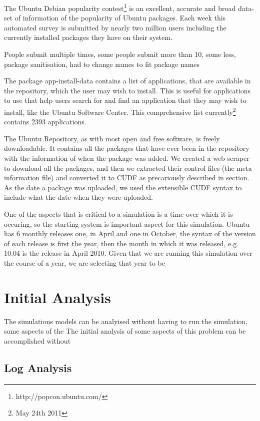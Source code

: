 The Ubuntu Debian popularity contest\footnote{http://popcon.ubuntu.com/} is an excellent, accurate and broad data-set of information of the popularity of Ubuntu packages.
Each week this automated survey is submitted by nearly two million users including the currently installed packages they have on their system.

People submit multiple times, some people submit more than 10, some less, package sanitisation, had to change names to fit package names

The package app-install-data contains a list of applications, that are available in the repository, which the user may wish to install.
This is useful for applications to use that help users search for and find an application that they may wish to install, like the Ubuntu Software Center.
This comprehensive list currently\footnote{May 24th 2011} contains 2393 applications.

The Ubuntu Repository, as with most open and free software, is freely downloadable.
It contains all the packages that have ever been in the repository with the information of when the package was added.
We created a web scraper to download all the packages, and then we extracted their control files (the meta information file) and converted it to CUDF as precariously described in section. %
As the date a package was uploaded, we used the extensible CUDF syntax to include what the date when they were uploaded.

One of the aspects that is critical to a simulation is a time over which it is occuring, 
so the starting system is important aspect for this simulation.
Ubuntu has 6 monthly releases one, in April and one in October, the syntax of the version of each release is first the year,
then the month in which it was released, e.g. 10.04 is the release in April 2010.
Given that we are running this simulation over the course of a year, we are selecting that year to be 


\section{Initial Analysis}
{}The simulations models can be analyised without having to run the simulation, some aspects of the 
{}The initial analysis of some aspects of this problem can be accomplished without 


\subsection{Log Analysis}

